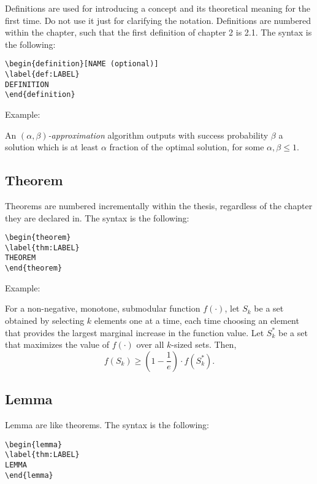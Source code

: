 Definitions are used for introducing a concept and its theoretical meaning for the first time. Do not use it just for clarifying the notation. Definitions are numbered within the chapter, such that the first definition of chapter 2 is 2.1. The syntax is the following:
\begin{verbatim}
\begin{definition}[NAME (optional)]
\label{def:LABEL}
DEFINITION
\end{definition}
\end{verbatim}

\noindent Example:

\begin{definition}
\label{def:alphabetaapprox}
An $(\alpha, \beta)$\textit{-approximation} algorithm outputs with success probability $\beta$ a solution which is at least $\alpha$ fraction of the optimal solution, for some $\alpha, \beta \leq 1$.
\end{definition}

\subsection*{Theorem}

Theorems are numbered incrementally within the thesis, regardless of the chapter they are declared in. The syntax is the following:
\begin{verbatim}
\begin{theorem}
\label{thm:LABEL}
THEOREM
\end{theorem}
\end{verbatim}

\noindent Example:

\begin{theorem}
\label{thm:approximation}
For a non-negative, monotone, submodular function $f(\cdot)$, let $S_k$ be a set obtained by selecting $k$ elements one at a time, each time choosing an element that provides the largest marginal increase in the function value. Let $S_k^*$ be a set that maximizes the value of $f(\cdot)$ over all $k$-sized sets. Then,
$$f(S_k) \geq \left( 1-\frac{1}{e} \right) \cdot f(S_k^*).$$
\end{theorem}

\subsection*{Lemma}
Lemma are like theorems. The syntax is the following:
\begin{verbatim}
\begin{lemma}
\label{thm:LABEL}
LEMMA
\end{lemma}
\end{verbatim}

